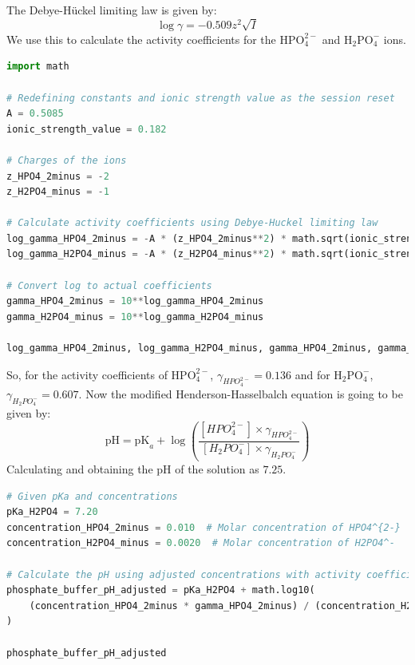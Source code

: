 \documentclass[12pt]{article}
\begin{document}
The Debye-Hückel limiting law is given by:
\begin{equation}
  \log \gamma=-0.509 z^{2} \sqrt{I}
\end{equation}
We use this to calculate the activity coefficients for the $\mathrm{HPO}_{4}^{2-}$ and $\mathrm{H}_{2}\mathrm{PO}_{4}^{-}$ ions.
\begin{lstlisting}[language=Python]
import math

# Redefining constants and ionic strength value as the session reset
A = 0.5085
ionic_strength_value = 0.182

# Charges of the ions
z_HPO4_2minus = -2
z_H2PO4_minus = -1

# Calculate activity coefficients using Debye-Huckel limiting law
log_gamma_HPO4_2minus = -A * (z_HPO4_2minus**2) * math.sqrt(ionic_strength_value)
log_gamma_H2PO4_minus = -A * (z_H2PO4_minus**2) * math.sqrt(ionic_strength_value)

# Convert log to actual coefficients
gamma_HPO4_2minus = 10**log_gamma_HPO4_2minus
gamma_H2PO4_minus = 10**log_gamma_H2PO4_minus

log_gamma_HPO4_2minus, log_gamma_H2PO4_minus, gamma_HPO4_2minus, gamma_H2PO4_minus
\end{lstlisting}
So, for the activity coefficients of $\mathrm{HPO}_{4}^{2-}$, $\gamma_{HPO_{4}^{2-}}=0.136$ and for $\mathrm{H}_{2}\mathrm{PO}_{4}^{-}$, $\gamma_{H_{2}PO_{4}^{-}}=0.607$.
Now the modified Henderson-Hasselbalch equation is going to be given by:
\begin{equation}
  \mathrm{pH}=\mathrm{pK}_{a}+\log \left(\frac{[HPO_{4}^{2-}] \times \gamma_{HPO_{4}^{2-}}}{[H_{2}PO_{4}^{-}] \times \gamma_{H_{2}PO_{4}^{-}}}\right)
\end{equation}
Calculating and obtaining the $\mathrm{pH}$ of the solution as $7.25$.
\begin{lstlisting}[language=Python]
# Given pKa and concentrations
pKa_H2PO4 = 7.20
concentration_HPO4_2minus = 0.010  # Molar concentration of HPO4^{2-}
concentration_H2PO4_minus = 0.0020  # Molar concentration of H2PO4^-

# Calculate the pH using adjusted concentrations with activity coefficients
phosphate_buffer_pH_adjusted = pKa_H2PO4 + math.log10(
    (concentration_HPO4_2minus * gamma_HPO4_2minus) / (concentration_H2PO4_minus * gamma_H2PO4_minus)
)

phosphate_buffer_pH_adjusted
\end{lstlisting}
\end{document}
